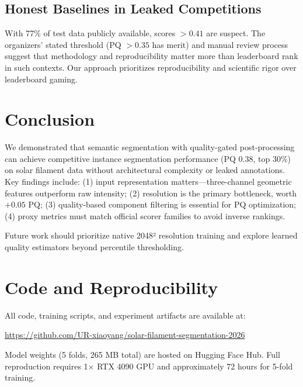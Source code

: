 \documentclass[conference]{IEEEtran}
\begin{document}
\subsection{Honest Baselines in Leaked Competitions}

With 77\% of test data publicly available, scores $> 0.41$ are suspect. The organizers' stated threshold (PQ $> 0.35$ has merit) and manual review process suggest that methodology and reproducibility matter more than leaderboard rank in such contexts. Our approach prioritizes reproducibility and scientific rigor over leaderboard gaming.

\section{Conclusion}

We demonstrated that semantic segmentation with quality-gated post-processing can achieve competitive instance segmentation performance (PQ 0.38, top 30\%) on solar filament data without architectural complexity or leaked annotations. Key findings include: (1) input representation matters---three-channel geometric features outperform raw intensity; (2) resolution is the primary bottleneck, worth $+0.05$ PQ; (3) quality-based component filtering is essential for PQ optimization; (4) proxy metrics must match official scorer families to avoid inverse rankings.

Future work should prioritize native 2048² resolution training and explore learned quality estimators beyond percentile thresholding.

\section*{Code and Reproducibility}

All code, training scripts, and experiment artifacts are available at:
\begin{center}
\url{https://github.com/UR-xiaoyang/solar-filament-segmentation-2026}
\end{center}

Model weights (5 folds, 265 MB total) are hosted on Hugging Face Hub. Full reproduction requires 1× RTX 4090 GPU and approximately 72 hours for 5-fold training.
\end{document}
